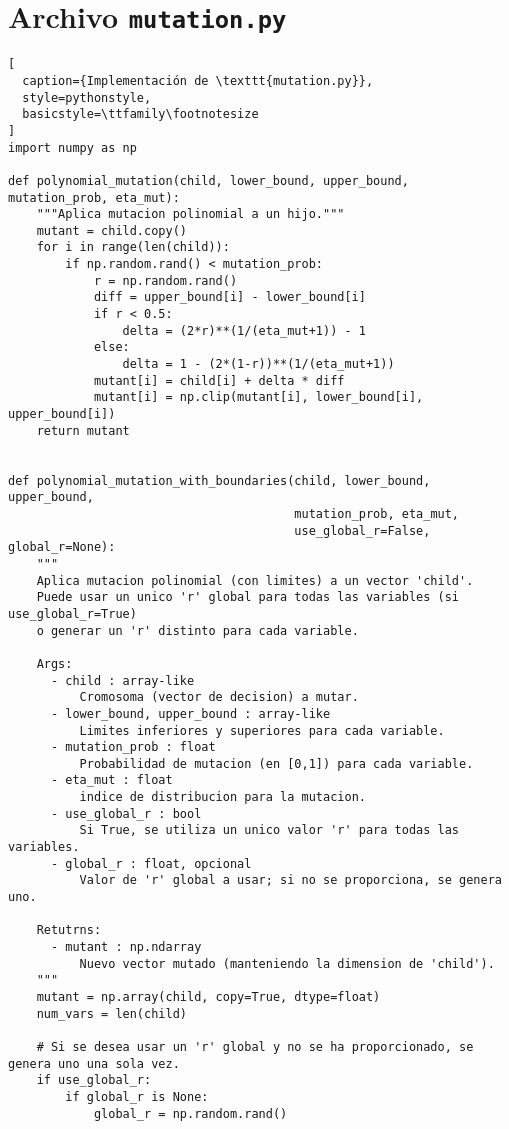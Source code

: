 \section{Archivo \texttt{mutation.py}}
\begin{lstlisting}[
  caption={Implementación de \texttt{mutation.py}},
  style=pythonstyle,
  basicstyle=\ttfamily\footnotesize
]
import numpy as np

def polynomial_mutation(child, lower_bound, upper_bound, mutation_prob, eta_mut):
    """Aplica mutacion polinomial a un hijo."""
    mutant = child.copy()
    for i in range(len(child)):
        if np.random.rand() < mutation_prob:
            r = np.random.rand()
            diff = upper_bound[i] - lower_bound[i]
            if r < 0.5:
                delta = (2*r)**(1/(eta_mut+1)) - 1
            else:
                delta = 1 - (2*(1-r))**(1/(eta_mut+1))
            mutant[i] = child[i] + delta * diff
            mutant[i] = np.clip(mutant[i], lower_bound[i], upper_bound[i])
    return mutant


def polynomial_mutation_with_boundaries(child, lower_bound, upper_bound,
                                        mutation_prob, eta_mut,
                                        use_global_r=False, global_r=None):
    """
    Aplica mutacion polinomial (con limites) a un vector 'child'.
    Puede usar un unico 'r' global para todas las variables (si use_global_r=True)
    o generar un 'r' distinto para cada variable.
    
    Args:
      - child : array-like
          Cromosoma (vector de decision) a mutar.
      - lower_bound, upper_bound : array-like
          Limites inferiores y superiores para cada variable.
      - mutation_prob : float
          Probabilidad de mutacion (en [0,1]) para cada variable.
      - eta_mut : float
          indice de distribucion para la mutacion.
      - use_global_r : bool
          Si True, se utiliza un unico valor 'r' para todas las variables.
      - global_r : float, opcional
          Valor de 'r' global a usar; si no se proporciona, se genera uno.
    
    Retutrns:
      - mutant : np.ndarray
          Nuevo vector mutado (manteniendo la dimension de 'child').
    """
    mutant = np.array(child, copy=True, dtype=float)
    num_vars = len(child)
    
    # Si se desea usar un 'r' global y no se ha proporcionado, se genera uno una sola vez.
    if use_global_r:
        if global_r is None:
            global_r = np.random.rand()
    

\end{lstlisting}
